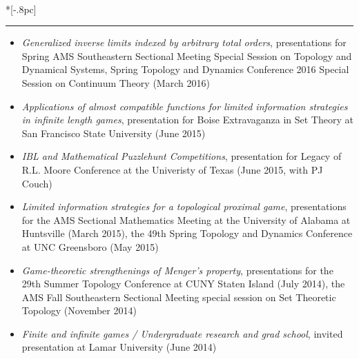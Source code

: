 \documentclass{article}
\newcommand{\headerText}[1]{
  \noindent{\large \bf #1} \\*[-.8pc]
  \rule{\textwidth}{.1pt}}
\begin{document}
\vfill


\headerText{Selected Presentations}
\begin{itemize}
  \item
    \emph{Generalized inverse limits indexed by arbitrary total orders},
    presentations for
      Spring AMS Southeastern Sectional Meeting Special Session on Topology and Dynamical Systems,
      Spring Topology and Dynamics Conference 2016 Special Session on Continuum Theory
      (March 2016)
  \item
    \emph{Applications of almost compatible functions for limited information strategies in infinite length games},
    presentation for
      Boise Extravaganza in Set Theory at San Francisco State University
      (June 2015)
  \item
    \emph{IBL and Mathematical Puzzlehunt Competitions},
    presentation for
      Legacy of R.L. Moore Conference at the Univeristy of Texas
      (June 2015, with PJ Couch)
  \item
    \emph{Limited information strategies for a topological proximal game},
    presentations for
      the AMS Sectional Mathematics Meeting at the University of
      Alabama at Huntsville (March 2015),
      the 49th Spring Topology and Dynamics Conference at
      UNC Greensboro (May 2015)
  \item
    \emph{Game-theoretic strengthenings of Menger's property},
    presentations for
      the 29th Summer Topology Conference at CUNY Staten Island (July 2014),
      the AMS Fall Southeastern Sectional Meeting special session on Set
      Theoretic Topology (November 2014)
  \item
    \emph{Finite and infinite games / Undergraduate research and grad school},
    invited presentation at Lamar University (June 2014)
\end{itemize}
\end{document}
